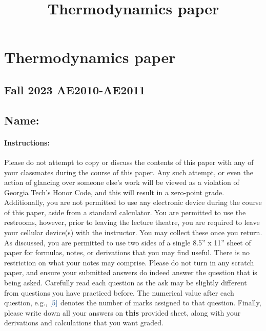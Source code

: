 \documentclass[
  twocolumn,
  landscape]{report}
\title{Thermodynamics paper}
\author{}
\date{}
\begin{document}
\maketitle
\ifdefined\Shaded\renewenvironment{Shaded}{\begin{tcolorbox}[boxrule=0pt, frame hidden, interior hidden, borderline west={3pt}{0pt}{shadecolor}, sharp corners, enhanced, breakable]}{\end{tcolorbox}}\fi

\hypertarget{thermodynamics-paper}{%
\chapter{Thermodynamics paper}\label{thermodynamics-paper}}

\hypertarget{fall-2023-ae2010-ae2011}{%
\section{Fall 2023 \textbar{}
AE2010-AE2011}\label{fall-2023-ae2010-ae2011}}

\hypertarget{name}{%
\section{Name:}\label{name}}

\hypertarget{instructions}{%
\subsubsection{Instructions:}\label{instructions}}

Please do not attempt to copy or discuss the contents of this paper with
any of your classmates during the course of this paper. Any such
attempt, or even the action of glancing over someone else's work will be
viewed as a violation of Georgia Tech's Honor Code, and this will result
in a zero-point grade. Additionally, you are not permitted to use any
electronic device during the course of this paper, aside from a standard
calculator. You are permitted to use the restrooms, however, prior to
leaving the lecture theatre, you are required to leave your cellular
device(s) with the instructor. You may collect these once you return. As
discussed, you are permitted to use two sides of a single 8.5'' x 11''
sheet of paper for formulas, notes, or derivations that you may find
useful. There is no restriction on what your notes may comprise. Please
do not turn in any scratch paper, and ensure your submitted answers do
indeed answer the question that is being asked. Carefully read each
question as the ask may be slightly different from questions you have
practiced before. The numerical value after each question, e.g.,
\({\color[rgb]{0.028509,0.250925,0.501969}[5]}\) denotes the number of
marks assigned to that question. Finally, please write down all your
answers on \textbf{this} provided sheet, along with your derivations and
calculations that you want graded.
\end{document}
